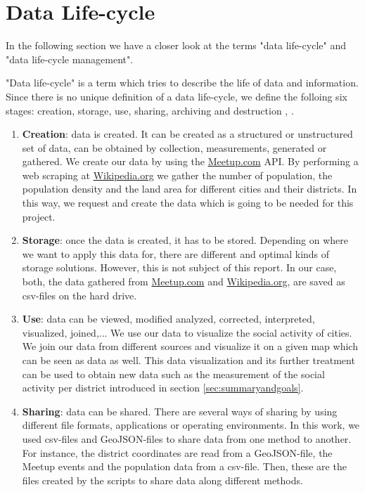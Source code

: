 \section{Data Life-cycle}\label{sec:datalifecycle}


In the following section we have a closer look at the terms "data life-cycle" and "data life-cycle management".

"Data life-cycle" is a term which tries to describe the life of data and information. Since there is no unique definition of a data life-cycle, we define the folloing six stages: creation, storage, use, sharing, archiving and destruction  \cite{marburg}, \cite{spirion}.

\begin{enumerate}
	\item \textbf{Creation}: data is created. It can be created as a structured or unstructured set of data, can be obtained by collection, measurements, generated or gathered. We create our data by using the \url{Meetup.com} API. By performing a web scraping at \url{Wikipedia.org} we gather the number of population, the population density and the land area for different cities and their districts. In this way, we request and create the data which is going to be needed for this project.
	\item \textbf{Storage}: once the data is created, it has to be stored. Depending on where we want to apply this data for, there are different and optimal kinds of storage solutions. However, this is not subject of this report. In our case, both, the data gathered from \url{Meetup.com} and \url{Wikipedia.org}, are saved as csv-files on the hard drive.
	\item \textbf{Use}: data can be viewed, modified analyzed, corrected, interpreted, visualized, joined,... We use our data to visualize the social activity of cities. We join our data from different sources and visualize it on a given map which can be seen as data as well. This data visualization and its further treatment can be used to obtain new data such as the measurement of the social activity per district introduced in section \ref{sec:summaryandgoals}.
	\item \textbf{Sharing}: data can be shared. There are several ways of sharing by using different file formats, applications or operating environments. In this work, we used csv-files and GeoJSON-files to share data from one method to another. For instance, the district coordinates are read from a GeoJSON-file, the Meetup events and the population data from a csv-file. Then, these are the files created by the scripts to share data along different methods.

\end{enumerate}
